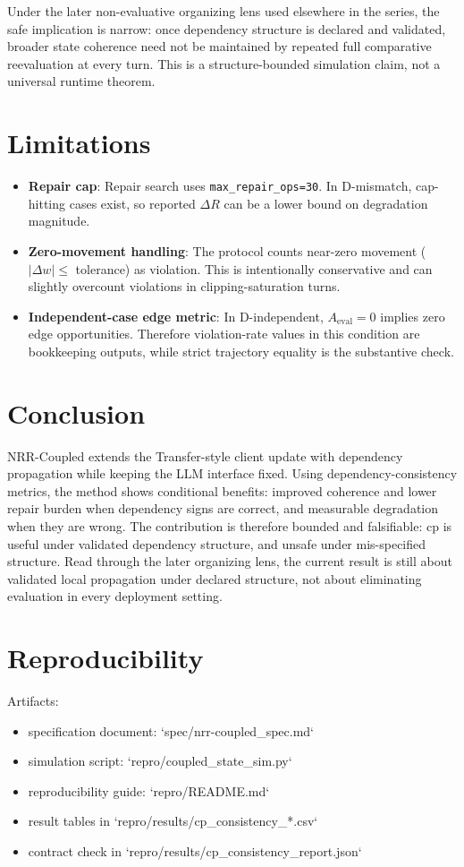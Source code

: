 \documentclass[11pt,a4paper]{article}
\begin{document}
Under the later non-evaluative organizing lens used elsewhere in the series, the safe
implication is narrow: once dependency structure is declared and validated, broader
state coherence need not be maintained by repeated full comparative reevaluation at
every turn. This is a structure-bounded simulation claim, not a universal runtime
theorem.

\section{Limitations}
\begin{itemize}
  \item \textbf{Repair cap}: Repair search uses \texttt{max\_repair\_ops=30}. In D-mismatch, cap-hitting cases exist, so reported \(\Delta R\) can be a lower bound on degradation magnitude.
  \item \textbf{Zero-movement handling}: The protocol counts near-zero movement (\(|\Delta w|\le\) tolerance) as violation. This is intentionally conservative and can slightly overcount violations in clipping-saturation turns.
  \item \textbf{Independent-case edge metric}: In D-independent, \(A_{\text{eval}}=0\) implies zero edge opportunities. Therefore violation-rate values in this condition are bookkeeping outputs, while strict trajectory equality is the substantive check.
\end{itemize}

\section{Conclusion}
NRR-Coupled extends the Transfer-style client update with dependency propagation while keeping the LLM interface fixed. Using dependency-consistency metrics, the method shows conditional benefits: improved coherence and lower repair burden when dependency signs are correct, and measurable degradation when they are wrong. The contribution is therefore bounded and falsifiable: cp is useful under validated dependency structure, and unsafe under mis-specified structure.
Read through the later organizing lens, the current result is still about validated
local propagation under declared structure, not about eliminating evaluation in every
deployment setting.

\section{Reproducibility}
Artifacts:
\begin{itemize}
  \item specification document: `spec/nrr-coupled\_spec.md`
  \item simulation script: `repro/coupled\_state\_sim.py`
  \item reproducibility guide: `repro/README.md`
  \item result tables in `repro/results/cp\_consistency\_*.csv`
  \item contract check in `repro/results/cp\_consistency\_report.json`
\end{itemize}
\end{document}
